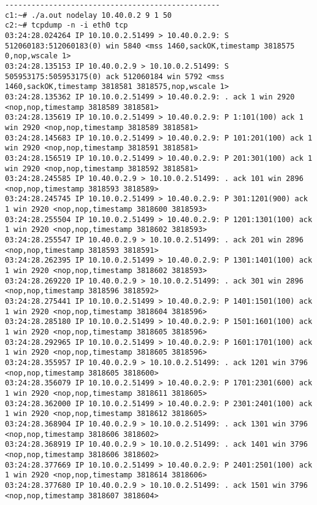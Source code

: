 \documentclass[a4paper,12pt]{article}
\begin{document}
\begin{lstlisting}
-------------------------------------------------
c1:~# ./a.out nodelay 10.40.0.2 9 1 50
c2:~# tcpdump -n -i eth0 tcp
03:24:28.024264 IP 10.10.0.2.51499 > 10.40.0.2.9: S 512060183:512060183(0) win 5840 <mss 1460,sackOK,timestamp 3818575 0,nop,wscale 1>
03:24:28.135153 IP 10.40.0.2.9 > 10.10.0.2.51499: S 505953175:505953175(0) ack 512060184 win 5792 <mss 1460,sackOK,timestamp 3818581 3818575,nop,wscale 1>
03:24:28.135362 IP 10.10.0.2.51499 > 10.40.0.2.9: . ack 1 win 2920 <nop,nop,timestamp 3818589 3818581>
03:24:28.135619 IP 10.10.0.2.51499 > 10.40.0.2.9: P 1:101(100) ack 1 win 2920 <nop,nop,timestamp 3818589 3818581>
03:24:28.145683 IP 10.10.0.2.51499 > 10.40.0.2.9: P 101:201(100) ack 1 win 2920 <nop,nop,timestamp 3818591 3818581>
03:24:28.156519 IP 10.10.0.2.51499 > 10.40.0.2.9: P 201:301(100) ack 1 win 2920 <nop,nop,timestamp 3818592 3818581>
03:24:28.245585 IP 10.40.0.2.9 > 10.10.0.2.51499: . ack 101 win 2896 <nop,nop,timestamp 3818593 3818589>
03:24:28.245745 IP 10.10.0.2.51499 > 10.40.0.2.9: P 301:1201(900) ack 1 win 2920 <nop,nop,timestamp 3818600 3818593>
03:24:28.255504 IP 10.10.0.2.51499 > 10.40.0.2.9: P 1201:1301(100) ack 1 win 2920 <nop,nop,timestamp 3818602 3818593>
03:24:28.255547 IP 10.40.0.2.9 > 10.10.0.2.51499: . ack 201 win 2896 <nop,nop,timestamp 3818593 3818591>
03:24:28.262395 IP 10.10.0.2.51499 > 10.40.0.2.9: P 1301:1401(100) ack 1 win 2920 <nop,nop,timestamp 3818602 3818593>
03:24:28.269220 IP 10.40.0.2.9 > 10.10.0.2.51499: . ack 301 win 2896 <nop,nop,timestamp 3818596 3818592>
03:24:28.275441 IP 10.10.0.2.51499 > 10.40.0.2.9: P 1401:1501(100) ack 1 win 2920 <nop,nop,timestamp 3818604 3818596>
03:24:28.285180 IP 10.10.0.2.51499 > 10.40.0.2.9: P 1501:1601(100) ack 1 win 2920 <nop,nop,timestamp 3818605 3818596>
03:24:28.292965 IP 10.10.0.2.51499 > 10.40.0.2.9: P 1601:1701(100) ack 1 win 2920 <nop,nop,timestamp 3818605 3818596>
03:24:28.355957 IP 10.40.0.2.9 > 10.10.0.2.51499: . ack 1201 win 3796 <nop,nop,timestamp 3818605 3818600>
03:24:28.356079 IP 10.10.0.2.51499 > 10.40.0.2.9: P 1701:2301(600) ack 1 win 2920 <nop,nop,timestamp 3818611 3818605>
03:24:28.362000 IP 10.10.0.2.51499 > 10.40.0.2.9: P 2301:2401(100) ack 1 win 2920 <nop,nop,timestamp 3818612 3818605>
03:24:28.368904 IP 10.40.0.2.9 > 10.10.0.2.51499: . ack 1301 win 3796 <nop,nop,timestamp 3818606 3818602>
03:24:28.368919 IP 10.40.0.2.9 > 10.10.0.2.51499: . ack 1401 win 3796 <nop,nop,timestamp 3818606 3818602>
03:24:28.377669 IP 10.10.0.2.51499 > 10.40.0.2.9: P 2401:2501(100) ack 1 win 2920 <nop,nop,timestamp 3818614 3818606>
03:24:28.377680 IP 10.40.0.2.9 > 10.10.0.2.51499: . ack 1501 win 3796 <nop,nop,timestamp 3818607 3818604>

\end{lstlisting}
\end{document}
